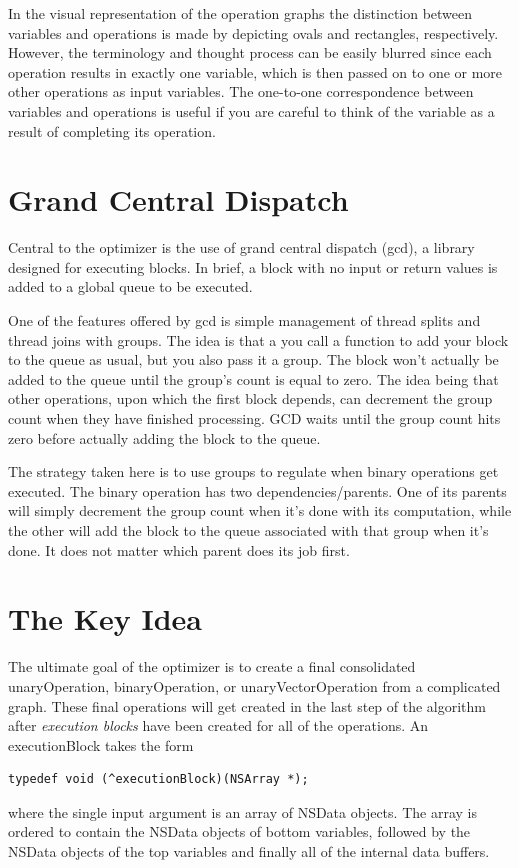 \documentclass[11pt]{article}
\begin{document}
In the visual representation of the operation graphs the distinction between variables and operations is made by depicting ovals and rectangles, respectively. However, the terminology and thought process can be easily blurred since each operation results in exactly one variable, which is then passed on to one or more other operations as input variables. The one-to-one correspondence between variables and operations is useful if you are careful to think of the variable as a result of completing its operation.

\section{Grand Central Dispatch}

Central to the optimizer is the use of grand central dispatch (gcd), a library designed for executing blocks. In brief, a block with no input or return values is added to a global queue to be executed.

One of the features offered by gcd is simple management of thread splits and thread joins with groups. The idea is that a you call a function to add your block to the queue as usual, but you also pass it a group. The block won't actually be added to the queue until the group's count is equal to zero. The idea being that other operations, upon which the first block depends, can decrement the group count when they have finished processing. GCD waits until the group count hits zero before actually adding the block to the queue.

The strategy taken here is to use groups to regulate when binary operations get executed. The binary operation has two dependencies/parents. One of its parents will simply decrement the group count when it's done with its computation, while the other will add the block to the queue associated with that group when it's done. It does not matter which parent does its job first.

\section{The Key Idea}

The ultimate goal of the optimizer is to create a final consolidated unaryOperation, binaryOperation, or unaryVectorOperation from a complicated graph. These final operations will get created in the last step of the algorithm after \emph{execution blocks} have been created for all of the operations. An executionBlock takes the form
\begin{verbatim}
typedef void (^executionBlock)(NSArray *);
\end{verbatim}
where the single input argument is an array of NSData objects. The array is ordered to contain the NSData objects of bottom variables, followed by the NSData objects of the top variables and finally all of the internal data buffers.
\end{document}
